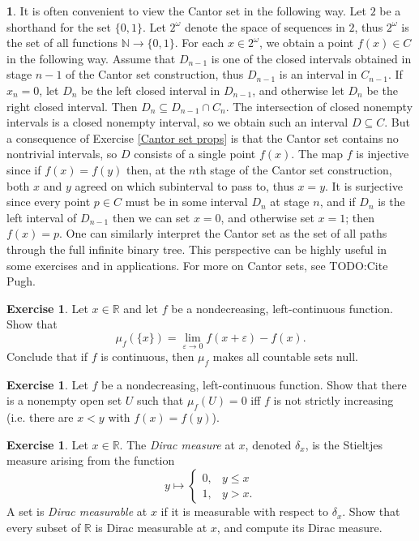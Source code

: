 \documentclass[12pt]{book}
\newcommand{\NN}{\mathbb{N}}
\newcommand{\RR}{\mathbb{R}}
\newcommand{\dfn}[1]{\emph{#1}\index{#1}}
\theoremstyle{definition}
\newtheorem{subsec}[theorem]{}
\newtheorem{exercise}[theorem]{Exercise}
\begin{document}
\begin{subsec}
It is often convenient to view the Cantor set in the following way. Let $2$ be a shorthand for the set $\{0, 1\}$.
Let $2^\omega$ denote the space of sequences in $2$, thus $2^\omega$ is the set of all functions $\NN \to \{0, 1\}$.
For each $x \in 2^\omega$, we obtain a point $f(x) \in C$ in the following way.
Assume that $D_{n-1}$ is one of the closed intervals obtained in stage $n-1$ of the Cantor set construction, thus $D_{n-1}$ is an interval in $C_{n-1}$.
If $x_n = 0$, let $D_n$ be the left closed interval in $D_{n-1}$, and otherwise let $D_n$ be the right closed interval.
Then $D_n \subseteq D_{n-1} \cap C_n$.
The intersection of closed nonempty intervals is a closed nonempty interval, so we obtain such an interval $D \subseteq C$.
But a consequence of Exercise \ref{Cantor set props} is that the Cantor set contains no nontrivial intervals, so $D$ consists of a single point $f(x)$.
The map $f$ is injective since if $f(x) = f(y)$ then, at the $n$th stage of the Cantor set construction, both $x$ and $y$ agreed on which subinterval to pass to, thus $x = y$.
It is surjective since every point $p \in C$ must be in some interval $D_n$ at stage $n$, and if $D_n$ is the left interval of $D_{n-1}$ then we can set $x = 0$, and otherwise set $x = 1$; then $f(x) = p$.
One can similarly interpret the Cantor set as the set of all paths through the full infinite binary tree.
This perspective can be highly useful in some exercises and in applications.
For more on Cantor sets, see TODO:Cite Pugh.
\end{subsec}

\begin{exercise}
Let $x \in \RR$ and let $f$ be a nondecreasing, left-continuous function. Show that
$$\mu_f(\{x\}) = \lim_{\varepsilon \to 0} f(x+\varepsilon) - f(x).$$
Conclude that if $f$ is continuous, then $\mu_f$ makes all countable sets null.
\end{exercise}

\begin{exercise}
Let $f$ be a nondecreasing, left-continuous function. Show that there is a nonempty open set $U$ such that $\mu_f(U) = 0$ iff $f$ is not strictly increasing (i.e. there are $x < y$ with $f(x) = f(y)$).
\end{exercise}

\begin{exercise}
\label{Dirac measure}
Let $x \in \RR$. The \dfn{Dirac measure} at $x$, denoted $\delta_x$, is the Stieltjes measure arising from the function
$$y \mapsto \begin{cases}
0, &y \leq x\\
1, &y > x.
\end{cases}$$
A set is \dfn{Dirac measurable} at $x$ if it is measurable with respect to $\delta_x$.
Show that every subset of $\RR$ is Dirac measurable at $x$, and compute its Dirac measure.
\end{exercise}
\end{document}
